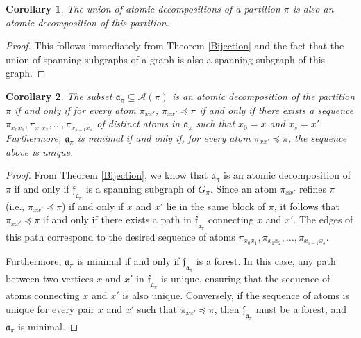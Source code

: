 \documentclass[12pt]{extarticle}
\newtheorem{Corollary}{Corollary}
\begin{document}
	
	\begin{Corollary} \label{closedunderunion}
		The union of atomic decompositions of a partition $\pi$ is also an atomic decomposition of this partition.
	\end{Corollary}
	\begin{proof} This follows immediately from Theorem \ref{Bijection} and the fact that the union of spanning subgraphs of a graph is also a spanning subgraph of this graph.
	\end{proof}
	
	\begin{Corollary} \label{Lemmauniqueseqeunce} The subset
		$\mathfrak{a}_{\pi}\subseteq \mathcal{A}(\pi)$ is an atomic decomposition of the partition $\pi$ if and only if for every  atom 
		$\pi_{xx'}$,  $\pi_{xx'}\preceq \pi$ if and only if there exists a  sequence   $\pi_{x_0x_1}, \pi_{x_1x_2}, \ldots,\pi_{x_{s-1}x_s}$  of distinct atoms in $\mathfrak{a}_{\pi}$ such that $x_0=x$  and  $x_s=x'$.
		Furthermore, $\mathfrak{a}_{\pi}$ is minimal if and only if, for every atom $\pi_{xx'}\preceq \pi$, the sequence above is unique.
	\end{Corollary}
	\begin{proof} From Theorem \ref{Bijection}, we know that $\mathfrak{a}_{\pi}$ is an atomic decomposition of $\pi$ if and only if $\mathfrak{f}_{\mathfrak{a}_{\pi}}$ is a spanning subgraph of $G_{\pi}$. Since an atom $\pi_{xx'}$ refines $\pi$ (i.e., $\pi_{xx'} \preceq \pi$) if and only if $x$ and $x'$ lie in the same block of $\pi$, it follows that $\pi_{xx'} \preceq \pi$ if and only if there exists a path in $\mathfrak{f}_{\mathfrak{a}_{\pi}}$ connecting $x$ and $x'$. The edges of this path correspond to the desired sequence of atoms $\pi_{x_0x_1}, \pi_{x_1x_2}, \ldots, \pi_{x_{s-1}x_s}$.
		
		Furthermore, $\mathfrak{a}_{\pi}$ is minimal if and only if $\mathfrak{f}_{\mathfrak{a}_{\pi}}$ is a forest. In this case, any path between two vertices $x$ and $x'$ in $\mathfrak{f}_{\mathfrak{a}_{\pi}}$ is unique, ensuring that the sequence of atoms connecting $x$ and $x'$ is also unique. Conversely, if the sequence of atoms is unique for every pair $x$ and $x'$ such that $\pi_{xx'} \preceq \pi$, then $\mathfrak{f}_{\mathfrak{a}_{\pi}}$ must be a forest, and $\mathfrak{a}_{\pi}$ is minimal.
	\end{proof}	
	
\end{document}

